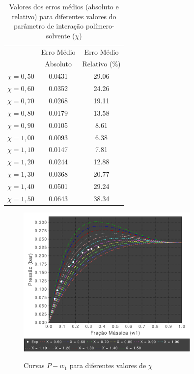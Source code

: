 \begin{table}
\centering
\renewcommand{\arraystretch}{1.3}
\caption{Valores dos erros médios (absoluto e relativo) para diferentes valores
do parâmetro de interação polímero-solvente ($\chi$)}
\begin{tabular}{cS[table-format=1.4,round-mode=places,round-precision=4]S[table-format=2.2,round-mode=places,round-precision=2]}
\toprule
& {Erro Médio} & {Erro Médio} 	\\
& {Absoluto} & {Relativo (\%)}	 \\
\midrule 
{$\chi = 0,50$} & 0.0431 & 29.06 \\
{$\chi = 0,60$} & 0.0352 & 24.26 \\
{$\chi = 0,70$} & 0.0268 & 19.11 \\
{$\chi = 0,80$} & 0.0179 & 13.58 \\
{$\chi = 0,90$} & 0.0105 & 8.61  \\
{$\chi = 1,00$} & 0.0093 & 6.38  \\
{$\chi = 1,10$} & 0.0147 & 7.81  \\
{$\chi = 1,20$} & 0.0244 & 12.88 \\
{$\chi = 1,30$} & 0.0368 & 20.77 \\
{$\chi = 1,40$} & 0.0501 & 29.24 \\
{$\chi = 1,50$} & 0.0643 & 38.34 \\
\bottomrule
\end{tabular}
\label{tab:allresult}
\end{table}

\begin{figure}
\centering
{\includegraphics[width=0.8\textwidth]{img/Trab4Ki.pdf}} 
\caption{Curvas $P-w_1$ para diferentes valores de $\chi$}
\label{fig:trab4ki}
\end{figure}

